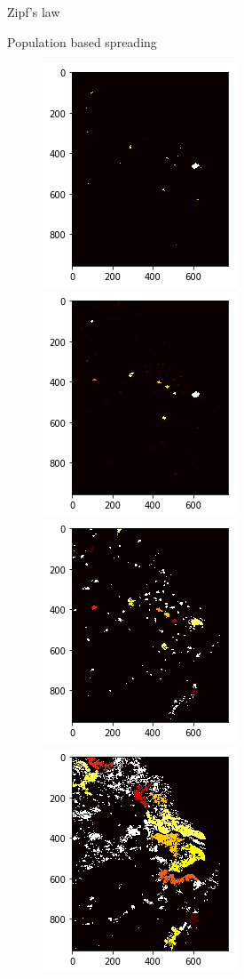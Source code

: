 \documentclass{beamer}
\begin{document}
\begin{frame}{Zipf's law}
\begin{frame}{Population based spreading}
  \begin{figure}
    \includegraphics[width = 0.34\linewidth]{pics/ntl/jzh/jzh4.png}
    \includegraphics[width = 0.34\linewidth]{pics/ntl/jzh/jzh3.png}
    \includegraphics[width = 0.34\linewidth]{pics/ntl/jzh/jzh2.png}
    \includegraphics[width = 0.34\linewidth]{pics/ntl/jzh/jzh1.png}
  \end{figure}
\end{frame}


\end{frame}
\end{document}

